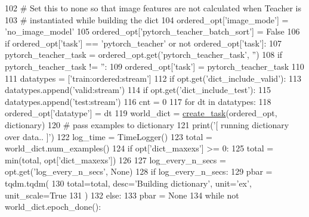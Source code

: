 \begin{DoxyCode}
102     \textcolor{comment}{# Set this to none so that image features are not calculated when Teacher is}
103     \textcolor{comment}{# instantiated while building the dict}
104     ordered\_opt[\textcolor{stringliteral}{'image\_mode'}] = \textcolor{stringliteral}{'no\_image\_model'}
105     ordered\_opt[\textcolor{stringliteral}{'pytorch\_teacher\_batch\_sort'}] = \textcolor{keyword}{False}
106     \textcolor{keywordflow}{if} ordered\_opt[\textcolor{stringliteral}{'task'}] == \textcolor{stringliteral}{'pytorch\_teacher'} \textcolor{keywordflow}{or} \textcolor{keywordflow}{not} ordered\_opt[\textcolor{stringliteral}{'task'}]:
107         pytorch\_teacher\_task = ordered\_opt.get(\textcolor{stringliteral}{'pytorch\_teacher\_task'}, \textcolor{stringliteral}{''})
108         \textcolor{keywordflow}{if} pytorch\_teacher\_task != \textcolor{stringliteral}{''}:
109             ordered\_opt[\textcolor{stringliteral}{'task'}] = pytorch\_teacher\_task
110 
111     datatypes = [\textcolor{stringliteral}{'train:ordered:stream'}]
112     \textcolor{keywordflow}{if} opt.get(\textcolor{stringliteral}{'dict\_include\_valid'}):
113         datatypes.append(\textcolor{stringliteral}{'valid:stream'})
114     \textcolor{keywordflow}{if} opt.get(\textcolor{stringliteral}{'dict\_include\_test'}):
115         datatypes.append(\textcolor{stringliteral}{'test:stream'})
116     cnt = 0
117     \textcolor{keywordflow}{for} dt \textcolor{keywordflow}{in} datatypes:
118         ordered\_opt[\textcolor{stringliteral}{'datatype'}] = dt
119         world\_dict = \hyperlink{namespaceparlai_1_1core_1_1worlds_a79969c7ba76d4b3c500f5bb776444dc6}{create\_task}(ordered\_opt, dictionary)
120         \textcolor{comment}{# pass examples to dictionary}
121         print(\textcolor{stringliteral}{'[ running dictionary over data.. ]'})
122         log\_time = TimeLogger()
123         total = world\_dict.num\_examples()
124         \textcolor{keywordflow}{if} opt[\textcolor{stringliteral}{'dict\_maxexs'}] >= 0:
125             total = min(total, opt[\textcolor{stringliteral}{'dict\_maxexs'}])
126 
127         log\_every\_n\_secs = opt.get(\textcolor{stringliteral}{'log\_every\_n\_secs'}, \textcolor{keywordtype}{None})
128         \textcolor{keywordflow}{if} log\_every\_n\_secs:
129             pbar = tqdm.tqdm(
130                 total=total, desc=\textcolor{stringliteral}{'Building dictionary'}, unit=\textcolor{stringliteral}{'ex'}, unit\_scale=\textcolor{keyword}{True}
131             )
132         \textcolor{keywordflow}{else}:
133             pbar = \textcolor{keywordtype}{None}
134         \textcolor{keywordflow}{while} \textcolor{keywordflow}{not} world\_dict.epoch\_done():

\end{DoxyCode}
